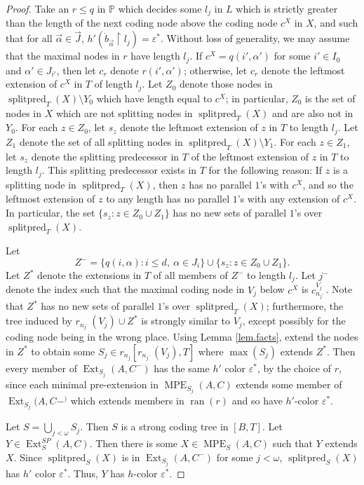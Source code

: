 \documentclass{amsart}
\theoremstyle{remark}
\theoremstyle{definition}
\theoremstyle{remark}
\newcommand{\al}{\alpha}
\newcommand{\om}{\omega}
\DeclareMathOperator{\ran}{ran}
\DeclareMathOperator{\Ext}{Ext}
\DeclareMathOperator{\splitpred}{splitpred}
\DeclareMathOperator{\MPE}{MPE}
\newcommand{\re}{\restriction}
\newcommand{\bP}{\mathbb{P}}
\begin{document}
\begin{proof}
Take an $r\le q$ in  $\bP$ which  decides some $l_j$ in $L$  which is strictly greater than the length of the next coding node above the  coding node  $c^X$ in $X$,
and such that
for all $\vec\al\in\vec{J}$,  $h'(\dot{b}_{\vec\al}\re l_j)=\varepsilon^*$.
Without loss of generality, we may assume that the maximal nodes in $r$ have length $l_j$.
If $c^X=q(i',\al')$ for some $i'\in I_0$ and $\al'\in J_{i'}$,
then let $c_r$ denote $r(i',\al')$;
otherwise, let $c_r$ denote the leftmost extension of $c^X$ in $T$ of length $l_j$.
Let $Z_0$ denote those nodes in $\splitpred_T(X)\setminus Y_0$  which have length equal to $c^X$; in particular, $Z_0$ is the set of nodes in $X$ which are not splitting nodes in $\splitpred_T(X)$ and are also not in $Y_0$.
For each $z\in Z_0$,
let $s_z$ denote the leftmost extension of $z$ in $T$ to length $l_j$.
Let $Z_1$ denote the set of all splitting nodes  in $\splitpred_T(X)\setminus Y_1$.
For each $z\in Z_1$, let $s_z$ denote the  splitting predecessor  in $T$ of the leftmost extension of $z$ in $T$ to length $l_j$.
This splitting predecessor exists in $T$ for the following reason:
If $z$ is a  splitting node  in $\splitpred_T(X)$,
then $z$ has no parallel $1$'s with $c^X$, and so the leftmost extension of $z$ to any length has no parallel $1$'s with any extension of $c^X$.
In particular, the set $\{s_z:z\in Z_0\cup Z_1\}$ has no new sets of parallel $1$'s over $\splitpred_T(X)$.



Let
\begin{equation}
Z^-=\{q(i,\al):i\le d,\ \al\in J_i\}\cup\{s_z:z\in Z_0\cup Z_1\}.
\end{equation}
Let $Z^*$ denote the extensions in $T$ of all members of $Z^-$ to length $l_j$.
Let $j{^-}$ denote the index such that the maximal coding node in $V_j$ below $c^X$ is $c^{V_j}_{n_{j^-}}$.
Note that $Z^*$ has no new sets of parallel $1$'s over $\splitpred_T(X)$;
furthermore,  the tree induced by
$r_{n_{j^-}}(V_j)\cup Z^*$ is strongly similar to $V_j$, except possibly for the coding node being in the wrong place.
Using Lemma \ref{lem.facts},
extend the nodes in $Z^*$
to obtain some $S_j\in r_{n_j}[r_{n_{j^-}}(V_j),T]$ where  $\max(S_j)$ extends $Z^*$.
Then every member of $\Ext_{S_j}(A,C^-)$ has the same $h'$ color $\varepsilon^*$,
by the choice of $r$,
since each minimal pre-extension in $\MPE_{S_j}(A,C)$ extends some member of $\Ext_{S_j}(A,C-^)$
which extends members in $\ran(r)$ and so have $h'$-color $\varepsilon^*$.


Let $S=\bigcup_{j<\om} S_j$.
Then $S$ is a strong coding tree in $[B,T]$.
Let $Y\in\Ext^{SP}_S(A,C)$.
Then there is some
 $X\in\MPE_S(A,C)$
such that $Y$ extends $X$.
Since
$\splitpred_S(X)$ is in $\Ext_{S_j}(A,C^-)$ for some $j<\om$,
$\splitpred_S(X)$ has
 $h'$ color $\varepsilon^*$.
Thus,
$Y$ has
 $h$-color $\varepsilon^*$.
\end{proof}
\end{document}
